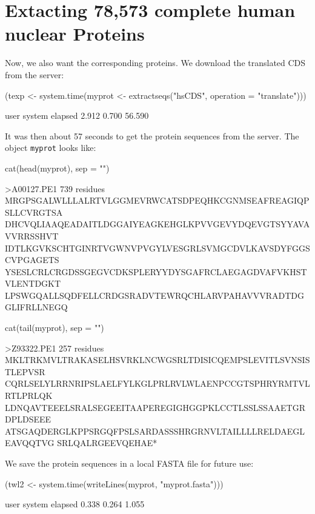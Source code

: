 \documentclass{article}
\begin{document}
\section{Extacting 78,573 complete human nuclear Proteins}

Now, we also want the corresponding proteins. We download the translated 
CDS from the server:

\begin{Schunk}
\begin{Sinput}
 (texp <- system.time(myprot <- extractseqs("hsCDS", operation = "translate")))
\end{Sinput}
\begin{Soutput}
   user  system elapsed 
  2.912   0.700  56.590 
\end{Soutput}
\end{Schunk}

It was then about 57 seconds
to get the protein sequences from the server. The object \texttt{myprot} looks
like:

\begin{Schunk}
\begin{Sinput}
 cat(head(myprot), sep = "\n")
\end{Sinput}
\begin{Soutput}
>A00127.PE1              739 residues
MRGPSGALWLLLALRTVLGGMEVRWCATSDPEQHKCGNMSEAFREAGIQPSLLCVRGTSA
DHCVQLIAAQEADAITLDGGAIYEAGKEHGLKPVVGEVYDQEVGTSYYAVAVVRRSSHVT
IDTLKGVKSCHTGINRTVGWNVPVGYLVESGRLSVMGCDVLKAVSDYFGGSCVPGAGETS
YSESLCRLCRGDSSGEGVCDKSPLERYYDYSGAFRCLAEGAGDVAFVKHSTVLENTDGKT
LPSWGQALLSQDFELLCRDGSRADVTEWRQCHLARVPAHAVVVRADTDGGLIFRLLNEGQ
\end{Soutput}
\begin{Sinput}
 cat(tail(myprot), sep = "\n")
\end{Sinput}
\begin{Soutput}
>Z93322.PE1              257 residues
MKLTRKMVLTRAKASELHSVRKLNCWGSRLTDISICQEMPSLEVITLSVNSISTLEPVSR
CQRLSELYLRRNRIPSLAELFYLKGLPRLRVLWLAENPCCGTSPHRYRMTVLRTLPRLQK
LDNQAVTEEELSRALSEGEEITAAPEREGIGHGGPKLCCTLSSLSSAAETGRDPLDSEEE
ATSGAQDERGLKPPSRGQFPSLSARDASSSHRGRNVLTAILLLLRELDAEGLEAVQQTVG
SRLQALRGEEVQEHAE*
\end{Soutput}
\end{Schunk}

We save the protein sequences in a local FASTA file for future use:

\begin{Schunk}
\begin{Sinput}
 (twl2 <- system.time(writeLines(myprot, "myprot.fasta")))
\end{Sinput}
\begin{Soutput}
   user  system elapsed 
  0.338   0.264   1.055 
\end{Soutput}
\end{Schunk}
\end{document}
